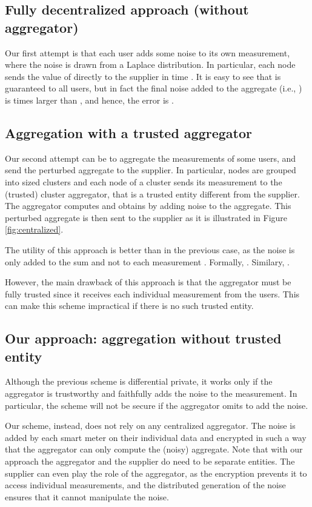 \documentclass[11pt,a4paper]{article}
\theoremstyle{plain}
\theoremstyle{plain}
\theoremstyle{plain}
\theoremstyle{plain}
\theoremstyle{nonumberplain} \theoremseparator{}
\begin{document}
\subsection{Fully decentralized approach (without aggregator)}
\label{sec:trusted_appoach}
Our first attempt is that each user adds some noise to its own measurement, where the noise
is drawn from a Laplace distribution. In particular, each node  sends the value of  directly to the supplier in time .  
It is easy to see that  is guaranteed to all users, but in fact
the final noise added to the aggregate (i.e., ) is  times larger than , and hence, the error is . 

\subsection{Aggregation with a trusted aggregator}
Our second attempt can be to aggregate the measurements of some users, and send the perturbed
aggregate to the supplier. In particular, nodes are grouped into  sized clusters and each node of a cluster sends its measurement  to the (trusted) cluster aggregator, that is a trusted entity different from the supplier. 
The aggregator computes   and obtains  by adding noise to the aggregate. This perturbed aggregate is then sent to the supplier as it is illustrated in Figure \ref{fig:centralized}.

The utility of this approach is better than in the previous case, as the noise is only added to the sum and not to each measurement . Formally, . Similary, 
. 

However, the main drawback of this approach is that the aggregator must be 
fully trusted since it receives each individual measurement from the users.
This can make this scheme impractical if there is no such trusted entity.


\subsection{Our approach: aggregation without trusted entity}

Although the previous scheme is differential private, it works only if the aggregator is trustworthy and faithfully adds the noise to the measurement. In particular, the scheme will not be secure if the aggregator omits to add the noise. 

Our scheme, instead, does not rely on any centralized aggregator. The noise is added by each smart meter on their individual data and encrypted in such a way that the aggregator can only compute the (noisy) aggregate. Note that with our approach the aggregator and the supplier do need to be separate entities. The supplier can even play the role of the aggregator, as the encryption prevents it to access individual measurements, and the distributed generation of the noise ensures that it cannot manipulate the noise.
\end{document}
